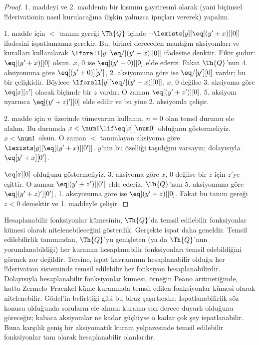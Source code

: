 \begin{proof}
1. maddeyi ve 2. maddenin bir kısmını gayriresmî olarak (yani biçimsel
!!{derivation}{}in nasıl kurulacağına ilişkin yalnızca ipuçları vererek)
yapalım.

1. madde için $<$ tanımı gereği $\Th{Q}$ içinde
$\lnot \lexists[y][\eq[(y'+x)][0]]$ ifadesini ispatlamamız gerekir. Bu,
birinci dereceden mantığın aksiyomları ve kuralları kullanılarak
$\lforall[y][\eq/[(y' + x)][0]]$ ifadesine denktir. Fikir şudur:
$\eq[(y'+x)][0]$ olsun. $x$, $0$ ise $\eq[(y' + 0)][0]$ elde ederiz. Fakat
$\Th{Q}$'nun 4. aksiyomuna göre $\eq[(y' + 0)][y']$, 2. aksiyomuna göre ise
$\eq/[y'][0]$ vardır; bu bir çelişkidir. Böylece
$\lforall[y][\eq/[(y' +x)][0]]$. $x$, $0$ değilse 3. aksiyoma göre
$\eq[x][z']$ olacak biçimde bir $z$ vardır. O zaman
$\eq[(y' + z')][0]$. 5. aksiyom uyarınca $\eq[(y' + z)'][0]$ elde edilir ve
bu yine 2. aksiyomla çelişir.

2. madde için $n$ üzerinde tümevarım kullanın. $n=0$ olan temel durumu ele
alalım. Bu durumda $x < \num 1 \lif \eq[x][\num 0]$ olduğunu göstermeliyiz.
$x < \num 1$ olsun. O zaman $<$ tanımlayan aksiyoma göre
$\lexists[y][\eq[(y'+x)][0']]$. $y$'nin bu özelliği taşıdığını varsayın;
dolayısıyla $\eq[y'+x][0']$.

$\eq[x][0]$ olduğunu göstermeliyiz. 3. aksiyoma göre $x$, $0$ değilse bir
$z$ için $z'$ye eşittir. O zaman $\eq[(y' + z')][0']$ elde ederiz.
$\Th{Q}$'nun 5. aksiyomuna göre $\eq[(y'+z)'][0']$, 1. aksiyomuna göre ise
$\eq[(y' + z)][0]$. Fakat bu tanım gereği $z < 0$ demektir ve 1. maddeyle
çelişir.
\end{proof}

\begin{explain}
Hesaplanabilir fonksiyonlar kümesinin, $\Th{Q}$'da temsil edilebilir
fonksiyonlar kümesi olarak nitelenebileceğini gösterdik. Gerçekte ispat daha
geneldir. Temsil edilebilirlik tanımından, $\Th{Q}$'yu genişleten (ya da
$\Th{Q}$'nun yorumlanabildiği) her kuramın hesaplanabilir fonksiyonları temsil
edebildiğini görmek zor değildir. Tersine, ispat kavramının hesaplanabilir
olduğu her !!{derivation} sisteminde temsil edilebilir her fonksiyon
hesaplanabilirdir. Dolayısıyla hesaplanabilir fonksiyonlar kümesi, örneğin
Peano aritmetiğinde, hatta Zermelo--Fraenkel küme kuramında temsil edilen
fonksiyonlar kümesi olarak nitelenebilir. Gödel'in belirttiği gibi bu biraz
şaşırtıcıdır. İspatlanabilirlik söz konusu olduğunda soruların ele alınan
kurama son derece duyarlı olduğunu göreceğiz; kabaca aksiyomlar ne kadar
güçlüyse o kadar çok şey ispatlanabilir. Buna karşılık geniş bir aksiyomatik
kuram yelpazesinde temsil edilebilir fonksiyonlar tam olarak hesaplanabilir
olanlardır.
\end{explain}

